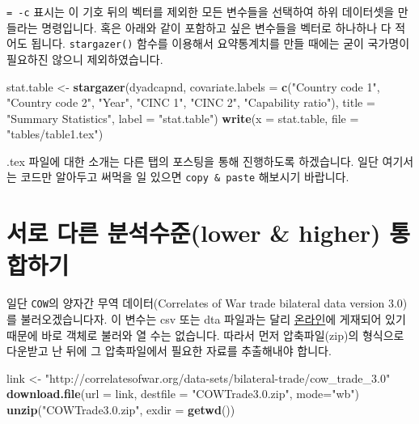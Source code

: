\documentclass[]{book}
\newenvironment{Shaded}{\begin{snugshade}}{\end{snugshade}}
\newcommand{\DataTypeTok}[1]{\textcolor[rgb]{0.13,0.29,0.53}{#1}}
\newcommand{\KeywordTok}[1]{\textcolor[rgb]{0.13,0.29,0.53}{\textbf{#1}}}
\newcommand{\NormalTok}[1]{#1}
\newcommand{\StringTok}[1]{\textcolor[rgb]{0.31,0.60,0.02}{#1}}
\begin{document}
\texttt{=\ -c} 표시는 이 기호 뒤의 벡터를 제외한 모든 변수들을 선택하여 하위 데이터셋을 만들라는 명령입니다. 혹은 아래와 같이 포함하고 싶은 변수들을 벡터로 하나하나 다 적어도 됩니다.
\texttt{stargazer()} 함수를 이용해서 요약통계치를 만들 때에는 굳이 국가명이 필요하진 않으니 제외하였습니다.

\begin{Shaded}
\begin{Highlighting}[]
\NormalTok{stat.table <-}\StringTok{ }\KeywordTok{stargazer}\NormalTok{(dyadcapnd, }
                        \DataTypeTok{covariate.labels =} 
                          \KeywordTok{c}\NormalTok{(}\StringTok{"Country code 1"}\NormalTok{, }
                            \StringTok{"Country code 2"}\NormalTok{, }\StringTok{"Year"}\NormalTok{, }
                            \StringTok{"CINC 1"}\NormalTok{, }\StringTok{"CINC 2"}\NormalTok{, }
                            \StringTok{"Capability ratio"}\NormalTok{), }
                        \DataTypeTok{title =} \StringTok{"Summary Statistics"}\NormalTok{,}
                        \DataTypeTok{label =} \StringTok{"stat.table"}\NormalTok{)}
\KeywordTok{write}\NormalTok{(}\DataTypeTok{x =}\NormalTok{ stat.table, }\DataTypeTok{file =} \StringTok{"tables/table1.tex"}\NormalTok{)}
\end{Highlighting}
\end{Shaded}

.tex 파일에 대한 소개는 다른 탭의 포스팅을 통해 진행하도록 하겠습니다. 일단 여기서는 코드만 알아두고 써먹을 일 있으면 \texttt{copy\ \&\ paste} 해보시기 바랍니다.

\hypertarget{uxc11cuxb85c-uxb2e4uxb978-uxbd84uxc11duxc218uxc900lower-higher-uxd1b5uxd569uxd558uxae30}{%
\section{서로 다른 분석수준(lower \& higher) 통합하기}\label{uxc11cuxb85c-uxb2e4uxb978-uxbd84uxc11duxc218uxc900lower-higher-uxd1b5uxd569uxd558uxae30}}

일단 \texttt{COW}의 양자간 무역 데이터(Correlates of War trade bilateral data version 3.0)를 불러오겠습니다자. 이 변수는 csv 또는 dta 파일과는 달리 \href{http://www.correlatesofwar.org/COW2\%20Data/Trade/Trade.html}{온라인}에 게재되어 있기 때문에 바로 객체로 불러와 열 수는 없습니다. 따라서 먼저 압축파일(zip)의 형식으로 다운받고 난 뒤에 그 압축파일에서 필요한 자료를 추출해내야 합니다.

\begin{Shaded}
\begin{Highlighting}[]
\NormalTok{link <-}\StringTok{ "http://correlatesofwar.org/data-sets/bilateral-trade/cow_trade_3.0"}
\KeywordTok{download.file}\NormalTok{(}\DataTypeTok{url =}\NormalTok{ link,}
              \DataTypeTok{destfile =} \StringTok{"COWTrade3.0.zip"}\NormalTok{, }\DataTypeTok{mode=}\StringTok{"wb"}\NormalTok{)}
\KeywordTok{unzip}\NormalTok{(}\StringTok{"COWTrade3.0.zip"}\NormalTok{, }\DataTypeTok{exdir =} \KeywordTok{getwd}\NormalTok{())}
\end{Highlighting}
\end{Shaded}
\end{document}
